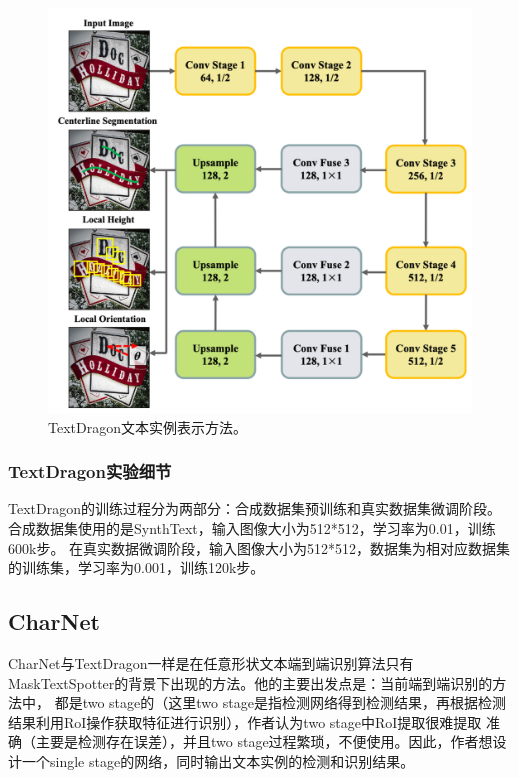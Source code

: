 \begin{figure}[htb]
    \centering
    \includegraphics[width=.7\textwidth]{figure/spotting/textdragon_representation.png} 
    \caption{TextDragon文本实例表示方法。} 
    \label{textdragon_representation} 
\end{figure}

\subsubsection{TextDragon实验细节}
TextDragon的训练过程分为两部分：合成数据集预训练和真实数据集微调阶段。
合成数据集使用的是SynthText，输入图像大小为512*512，学习率为0.01，训练600k步。
在真实数据微调阶段，输入图像大小为512*512，数据集为相对应数据集的训练集，学习率为0.001，训练120k步。

\subsection{CharNet}
CharNet与TextDragon一样是在任意形状文本端到端识别算法只有MaskTextSpotter的背景下出现的方法。他的主要出发点是：当前端到端识别的方法中，
都是two stage的（这里two stage是指检测网络得到检测结果，再根据检测结果利用RoI操作获取特征进行识别），作者认为two stage中RoI提取很难提取
准确（主要是检测存在误差），并且two stage过程繁琐，不便使用。因此，作者想设计一个single stage的网络，同时输出文本实例的检测和识别结果。
